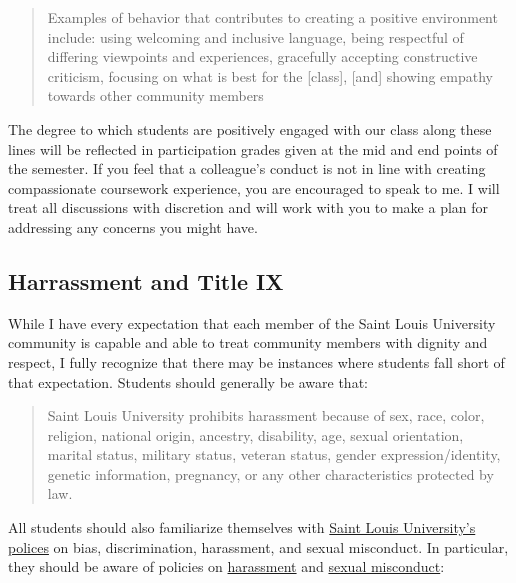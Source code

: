 \documentclass[]{book}
\begin{document}
\begin{quote}
Examples of behavior that contributes to creating a positive environment include: using welcoming and inclusive language, being respectful of differing viewpoints and experiences, gracefully accepting constructive criticism, focusing on what is best for the {[}class{]}, {[}and{]} showing empathy towards other community members
\end{quote}

The degree to which students are positively engaged with our class along these lines will be reflected in participation grades given at the mid and end points of the semester. If you feel that a colleague's conduct is not in line with creating compassionate coursework experience, you are encouraged to speak to me. I will treat all discussions with discretion and will work with you to make a plan for addressing any concerns you might have.

\hypertarget{harrassment-and-title-ix}{%
\subsection{Harrassment and Title IX}\label{harrassment-and-title-ix}}

While I have every expectation that each member of the Saint Louis University community is capable and able to treat community members with dignity and respect, I fully recognize that there may be instances where students fall short of that expectation. Students should generally be aware that:

\begin{quote}
Saint Louis University prohibits harassment because of sex, race, color, religion, national origin, ancestry, disability, age, sexual orientation, marital status, military status, veteran status, gender expression/identity, genetic information, pregnancy, or any other characteristics protected by law.
\end{quote}

All students should also familiarize themselves with \href{http://www.slu.edu/general-counsel-home/office-of-institutional-equity-and-diversity}{Saint Louis University's polices} on bias, discrimination, harassment, and sexual misconduct. In particular, they should be aware of policies on \href{https://www.slu.edu/general-counsel/institutional-equity-diversity/pdfs/harassment-policy.pdf}{harassment} and \href{https://www.slu.edu/about/safety/sexual-assault-resources.php}{sexual misconduct}:
\end{document}
